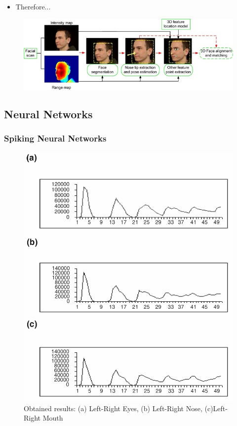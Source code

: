 \documentclass[compress]{beamer}
\begin{document}
\begin{frame}
	\begin{itemize}
	\item Therefore...
	\end{itemize}
	\begin{figure}[h]
    \centering
    \includegraphics[scale=0.7]{img/featuresExtraction.jpg}
	\end{figure}
\end{frame}

\subsection{Neural Networks}
\begin{frame}
	\frametitle{Spiking Neural Networks}
	\begin{figure}[h]
    \centering
    \includegraphics[scale=0.7]{img/snn.png}
    \caption{Obtained results: (a) Left-Right Eyes, (b) Left-Right Nose, (c)Left-Right Mouth}
	\end{figure}
\end{frame}
\end{document}
